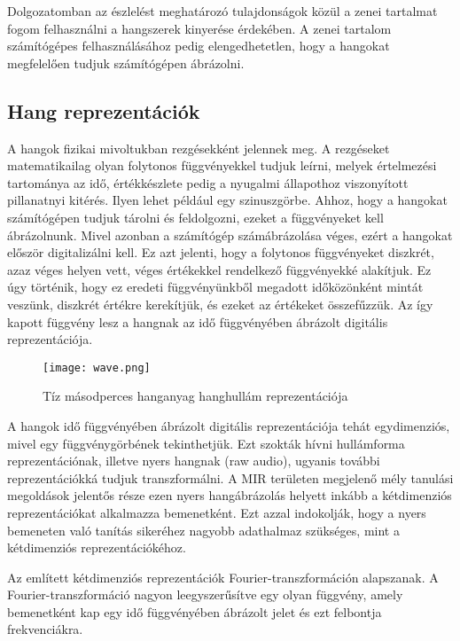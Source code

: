 Dolgozatomban az észlelést meghatározó tulajdonságok közül a zenei tartalmat fogom felhasználni a hangszerek kinyerése érdekében. A zenei tartalom számítógépes felhasználásához pedig elengedhetetlen, hogy a hangokat megfelelően tudjuk számítógépen ábrázolni.

\subsection{Hang reprezentációk}

A hangok fizikai mivoltukban rezgésekként jelennek meg. A rezgéseket matematikailag olyan folytonos függvényekkel tudjuk leírni, melyek értelmezési tartománya az idő, értékkészlete pedig a nyugalmi állapothoz viszonyított pillanatnyi kitérés. Ilyen lehet például egy szinuszgörbe. Ahhoz, hogy a hangokat számítógépen tudjuk tárolni és feldolgozni, ezeket a függvényeket kell ábrázolnunk.  Mivel azonban a számítógép számábrázolása véges, ezért a hangokat először digitalizálni kell. Ez azt jelenti, hogy a folytonos függvényeket diszkrét, azaz véges helyen vett, véges értékekkel rendelkező függvényekké alakítjuk. Ez úgy történik, hogy ez eredeti függvényünkből megadott időközönként mintát veszünk, diszkrét értékre kerekítjük, és ezeket az értékeket összefűzzük. Az így kapott függvény lesz a hangnak az idő függvényében ábrázolt digitális reprezentációja.
\begin{figure}[H]
  \centering
  \texttt{[image: wave.png]}
  \caption{Tíz másodperces hanganyag hanghullám reprezentációja}
\end{figure}

A hangok idő függvényében ábrázolt digitális reprezentációja tehát egydimenziós, mivel egy függvénygörbének tekinthetjük. Ezt szokták hívni hullámforma reprezentációnak, illetve nyers hangnak (raw audio), ugyanis további reprezentációkká tudjuk transzformálni. A MIR területen megjelenő mély tanulási megoldások jelentős része ezen nyers hangábrázolás helyett inkább a kétdimenziós reprezentációkat alkalmazza bemenetként. Ezt azzal indokolják, hogy a nyers bemeneten való tanítás sikeréhez nagyobb adathalmaz szükséges, mint a kétdimenziós reprezentációkéhoz. \cite{Choi2017}

Az említett kétdimenziós reprezentációk Fourier-transzformáción alapszanak. A Fourier-transzformáció nagyon leegyszerűsítve egy olyan függvény, amely bemenetként kap egy idő függvényében ábrázolt jelet és ezt felbontja frekvenciákra. \cite{melspec}

